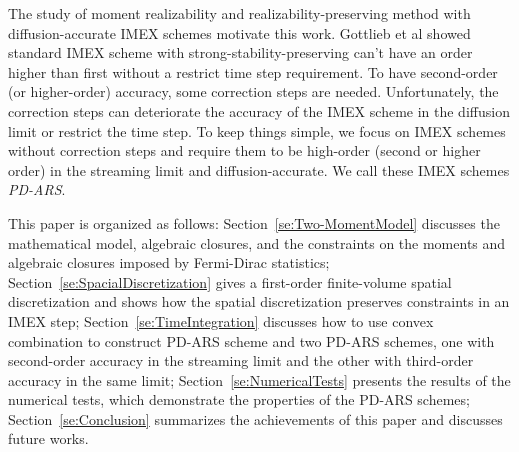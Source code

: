 The study of moment realizability and realizability-preserving method with diffusion-accurate IMEX schemes motivate this work.
Gottlieb et al\cite{gottlieb_etal_2001} showed standard IMEX scheme with strong-stability-preserving can't have an order higher than first without a restrict time step requirement.
To have second-order (or higher-order) accuracy, some correction steps are needed.
Unfortunately, the correction steps can deteriorate the accuracy of the IMEX scheme in the diffusion limit or restrict the time step.
To keep things simple, we focus on IMEX schemes without correction steps and require them to be high-order (second or higher order) in the streaming limit and diffusion-accurate.
We call these IMEX schemes \textit{PD-ARS}.

This paper is organized as follows: Section~\ref{se:Two-MomentModel} discusses the mathematical model, algebraic closures, and the constraints on the moments and algebraic closures imposed by Fermi-Dirac statistics;
Section~\ref{se:SpacialDiscretization} gives a first-order finite-volume spatial discretization and shows how the spatial discretization preserves constraints in an IMEX step;
Section~\ref{se:TimeIntegration} discusses how to use convex combination to construct PD-ARS scheme and two PD-ARS schemes, one with second-order accuracy in the streaming limit and the other with third-order accuracy in the same limit;
Section~\ref{se:NumericalTests} presents the results of the numerical tests, which demonstrate the properties of the PD-ARS schemes; Section~\ref{se:Conclusion} summarizes the achievements of this paper and discusses future works.

